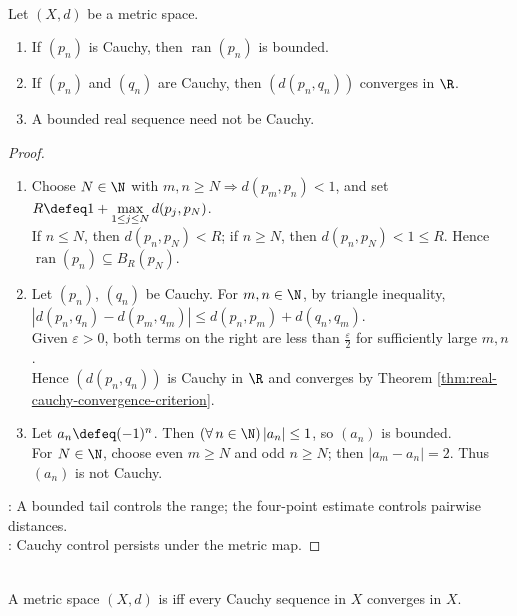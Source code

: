\begin{proposition} \label{prop:cauchy-sequences-bounded-distance-converges} \\
Let $(X,d)$ be a metric space.
\begin{enumerate}[label=(\roman*)]
\setlength{\itemsep}{0pt}
\item If $(p_n)$ is Cauchy, then $\operatorname{ran}(p_n)$ is bounded.
\item If $(p_n)$ and $(q_n)$ are Cauchy, then $(d(p_n,q_n))$ converges in $\R$.
\item A bounded real sequence need not be Cauchy.
\end{enumerate}
\begin{proof}
\begin{enumerate}[label=(\roman*)]
\setlength{\itemsep}{0pt}
\item Choose $N\in\N$ with $m,n\geq N\Longrightarrow d(p_m,p_n)<1$, and set $R\defeq1+\max\limits_{1\leq j\leq N}d(p_j,p_N)$.\\
If $n\leq N$, then $d(p_n,p_N)<R$; if $n\geq N$, then $d(p_n,p_N)<1\leq R$. Hence $\operatorname{ran}(p_n)\subseteq B_R(p_N)$.
\item Let $(p_n)$, $(q_n)$ be Cauchy. For $m,n\in\N$, by triangle inequality, $|d(p_n,q_n)-d(p_m,q_m)|\leq d(p_n,p_m)+d(q_n,q_m)$.\\
Given $\varepsilon>0$, both terms on the right are less than $\frac{\varepsilon}{2}$ for sufficiently large $m,n$.\\
Hence $(d(p_n,q_n))$ is Cauchy in $\R$ and converges by Theorem \ref{thm:real-cauchy-convergence-criterion}.
\item Let $a_n\defeq(-1)^n$. Then $(\forall\,n\in\N)\,|a_n|\leq1$, so $(a_n)$ is bounded.\\
For $N\in\N$, choose even $m\geq N$ and odd $n\geq N$; then $|a_m-a_n|=2$. Thus $(a_n)$ is not Cauchy.
\end{enumerate}
: A bounded tail controls the range; the four-point estimate controls pairwise distances.\\
: Cauchy control persists under the metric map.
\end{proof}
\end{proposition}

\begin{definition} \label{def:complete-metric-space} \\
A metric space $(X,d)$ is  iff every Cauchy sequence in $X$ converges in $X$.
\end{definition}


